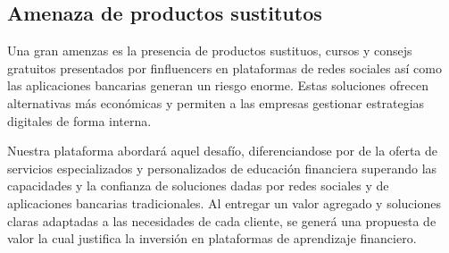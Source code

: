 \subsection*{Amenaza de productos sustitutos}
Una gran amenzas es la presencia de productos sustituos, cursos y consejs gratuitos presentados por finfluencers en plataformas de redes sociales así como las aplicaciones bancarias generan un riesgo enorme. Estas soluciones ofrecen alternativas más económicas y permiten a las empresas gestionar estrategias digitales de forma interna.

Nuestra plataforma abordará aquel desafío, diferenciandose por de la oferta de servicios especializados y personalizados de educación financiera superando las capacidades y la confianza de soluciones dadas por redes sociales y de aplicaciones bancarias tradicionales. Al entregar un valor agregado y soluciones claras adaptadas a las necesidades de cada cliente, se generá una propuesta de valor la cual justifica la inversión en plataformas de aprendizaje financiero.